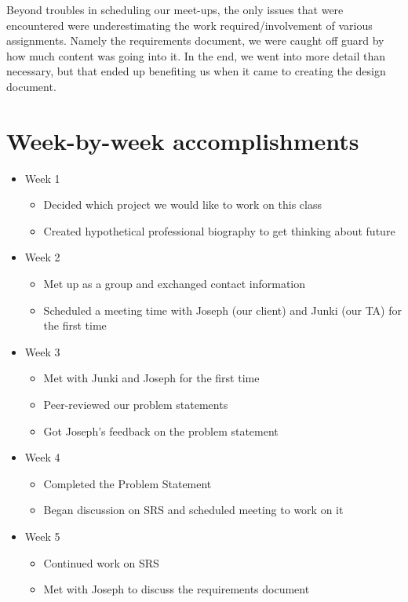 \documentclass[onecolumn, draftclsnofoot,10pt, compsoc]{IEEEtran}
\begin{document}
Beyond troubles in scheduling our meet-ups, the only issues that were encountered were underestimating the work required/involvement of various assignments.
Namely the requirements document, we were caught off guard by how much content was going into it.
In the end, we went into more detail than necessary, but that ended up benefiting us when it came to creating the design document.

\section{Week-by-week accomplishments}
\begin{itemize}
\item Week 1
	\begin{itemize}
	\item Decided which project we would like to work on this class
    \item Created hypothetical professional biography to get thinking about future
	\end{itemize}
\item Week 2
	\begin{itemize}
	\item Met up as a group and exchanged contact information
    \item Scheduled a meeting time with Joseph (our client) and Junki (our TA) for the first time
	\end{itemize}
\item Week 3
	\begin{itemize}
	\item Met with Junki and Joseph for the first time
    \item Peer-reviewed our problem statements
    \item Got Joseph's feedback on the problem statement
	\end{itemize}
\item Week 4
	\begin{itemize}
	\item Completed the Problem Statement
    \item Began discussion on SRS and scheduled meeting to work on it
	\end{itemize}
\item Week 5
	\begin{itemize}
	\item Continued work on SRS
    \item Met with Joseph to discuss the requirements document

\end{itemize}
\end{itemize}
\end{document}
